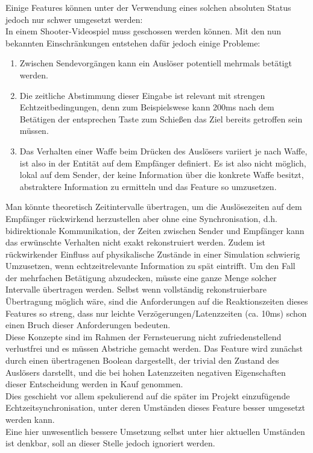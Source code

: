 Einige Features können unter der Verwendung eines solchen absoluten Status jedoch nur schwer umgesetzt werden:\\
In einem Shooter-Videospiel muss geschossen werden können. Mit den nun bekannten Einschränkungen entstehen dafür jedoch einige Probleme:
\begin{enumerate}
\item Zwischen Sendevorgängen kann ein Auslöser potentiell mehrmals betätigt werden.
\item Die zeitliche Abstimmung dieser Eingabe ist relevant mit strengen Echtzeitbedingungen, denn zum Beispielswese kann 200ms nach dem Betätigen der entsprechen Taste zum Schießen das Ziel bereits getroffen sein müssen.
\item Das Verhalten einer Waffe beim Drücken des Auslösers variiert je nach Waffe, ist also in der Entität auf dem Empfänger definiert. Es ist also nicht möglich, lokal auf dem Sender, der keine Information über die konkrete Waffe besitzt, abstraktere Information zu ermitteln und das Feature so umzusetzen.
\end{enumerate}
Man könnte theoretisch Zeitintervalle übertragen, um die Auslösezeiten auf dem Empfänger rückwirkend herzustellen aber ohne eine Synchronisation, d.h. bidirektionale Kommunikation, der Zeiten zwischen Sender und Empfänger kann das erwünschte Verhalten nicht exakt rekonstruiert werden. Zudem ist rückwirkender Einfluss auf physikalische Zustände in einer Simulation schwierig Umzusetzen, wenn echtzeitrelevante Information zu spät eintrifft.
Um den Fall der mehrfachen Betätigung abzudecken, müsste eine ganze Menge solcher Intervalle übertragen werden. Selbst wenn vollständig rekonstruierbare Übertragung möglich wäre, sind die Anforderungen auf die Reaktionszeiten dieses Features so streng, dass nur leichte Verzögerungen/Latenzzeiten (ca. 10ms) schon einen Bruch dieser Anforderungen bedeuten.\\
Diese Konzepte sind im Rahmen der Fernsteuerung nicht zufriedenstellend verlustfrei und es müssen Abstriche gemacht werden. Das Feature wird zunächst durch einen übertragenen Boolean dargestellt, der trivial den Zustand des Auslösers darstellt, und die bei hohen Latenzzeiten negativen Eigenschaften dieser Entscheidung werden in Kauf genommen.\\
Dies geschieht vor allem spekulierend auf die später im Projekt einzufügende Echtzeitsynchronisation, unter deren Umständen dieses Feature besser umgesetzt werden kann.\\
Eine hier unwesentlich bessere Umsetzung selbst unter hier aktuellen Umständen ist denkbar, soll an dieser Stelle jedoch ignoriert werden.

